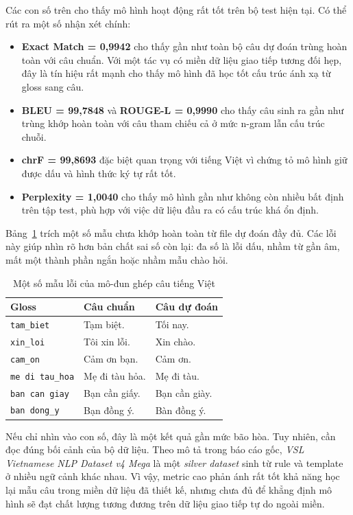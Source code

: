 Các con số trên cho thấy mô hình hoạt động rất tốt trên bộ test hiện tại. Có thể rút ra một
số nhận xét chính:
\begin{itemize}
    \item \textbf{Exact Match = 0,9942} cho thấy gần như toàn bộ câu dự đoán trùng hoàn
    toàn với câu chuẩn. Với một tác vụ có miền dữ liệu giao tiếp tương đối hẹp, đây là tín
    hiệu rất mạnh cho thấy mô hình đã học tốt cấu trúc ánh xạ từ gloss sang câu.
    \item \textbf{BLEU = 99,7848} và \textbf{ROUGE-L = 0,9990} cho thấy câu sinh ra gần
    như trùng khớp hoàn toàn với câu tham chiếu cả ở mức n-gram lẫn cấu trúc chuỗi.
    \item \textbf{chrF = 99,8693} đặc biệt quan trọng với tiếng Việt vì chứng tỏ mô hình giữ
    được dấu và hình thức ký tự rất tốt.
    \item \textbf{Perplexity = 1,0040} cho thấy mô hình gần như không còn nhiều bất định
    trên tập test, phù hợp với việc dữ liệu đầu ra có cấu trúc khá ổn định.
\end{itemize}

Bảng~\ref{tab:vietnamese-nlp-error-samples} trích một số mẫu chưa khớp hoàn toàn từ file dự đoán đầy đủ. Các lỗi này giúp nhìn rõ hơn bản chất sai số
còn lại: đa số là lỗi dấu, nhầm từ gần âm, mất một thành phần ngắn hoặc nhầm mẫu chào hỏi.

\begin{table}[H]
\centering
\caption{Một số mẫu lỗi của mô-đun ghép câu tiếng Việt}
\label{tab:vietnamese-nlp-error-samples}
\begin{tabularx}{\textwidth}{|p{3.4cm}|X|X|}
\hline
\textbf{Gloss} & \textbf{Câu chuẩn} & \textbf{Câu dự đoán} \\
\hline
\texttt{tam\_biet} & Tạm biệt. & Tối nay. \\
\hline
\texttt{xin\_loi} & Tôi xin lỗi. & Xin chào. \\
\hline
\texttt{cam\_on} & Cảm ơn bạn. & Cảm ơn. \\
\hline
\texttt{me di tau\_hoa} & Mẹ đi tàu hỏa. & Mẹ đi tàu. \\
\hline
\texttt{ban can giay} & Bạn cần giấy. & Bạn cần giày. \\
\hline
\texttt{ban dong\_y} & Bạn đồng ý. & Bàn đồng ý. \\
\hline
\end{tabularx}
\end{table}

Nếu chỉ nhìn vào con số, đây là một kết quả gần mức bão hòa. Tuy nhiên, cần đọc đúng bối
cảnh của bộ dữ liệu. Theo mô tả trong báo cáo gốc, \textit{VSL Vietnamese NLP Dataset
v4 Mega} là một \textit{silver dataset} sinh từ rule và template ở nhiều ngữ cảnh khác
nhau. Vì vậy, metric cao phản ánh rất tốt khả năng học lại mẫu câu trong miền dữ liệu đã
thiết kế, nhưng chưa đủ để khẳng định mô hình sẽ đạt chất lượng tương đương trên dữ liệu
giao tiếp tự do ngoài miền.

